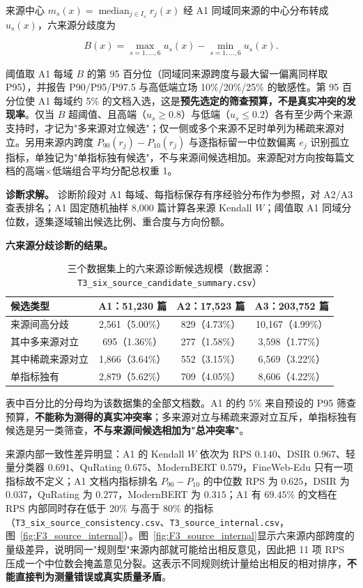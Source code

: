 来源中心 $m_s(x)=\operatorname{median}_{j\in I_s}r_j(x)$ 经 A1 同域同来源的中心分布转成 $u_s(x)$，六来源分歧度为

\begin{equation*}
B(x)=\max_{s=1,\dots,6}u_s(x)-\min_{s=1,\dots,6}u_s(x).
\end{equation*}

阈值取 A1 每域 $B$ 的第 95 百分位（同域同来源跨度与最大留一偏离同样取 P95），并报告 P90/P95/P97.5 与高低端立场 10\%/20\%/25\% 的敏感性。第 95 百分位使 A1 每域约 5\% 的文档入选，这是\textbf{预先选定的筛查预算，不是真实冲突的发现率}。仅当 $B$ 超阈值、且高端（$u_s\ge0.8$）与低端（$u_s\le0.2$）各有至少两个来源支持时，才记为"多来源对立候选"；仅一侧或多个来源不足时单列为稀疏来源对立。另用来源内跨度 $P_{90}(r_j)-P_{10}(r_j)$ 与逐指标留一中位数偏离 $e_j$ 识别孤立指标，单独记为"单指标独有候选"，不与来源间候选相加。来源配对方向按每篇文档的高端$\times$低端组合平均分配总权重 1。

\textbf{诊断求解。} 诊断阶段对 A1 每域、每指标保存有序经验分布作为参照，对 A2/A3 查表排名；A1 固定随机抽样 8,000 篇计算各来源 Kendall $W$；阈值取 A1 同域分位数，逐集逐域输出候选比例、重合度与方向份额。

\textbf{六来源分歧诊断的结果。}

\begin{table}[H]
\centering\small
\caption{三个数据集上的六来源诊断候选规模（数据源：\texttt{T3\_six\_source\_candidate\_summary.csv}）}
\label{tab:q1conflict}
\begin{tabularx}{\textwidth}{@{}lccc@{}}
\toprule
候选类型 & A1：51,230 篇 & A2：17,523 篇 & A3：203,752 篇 \\
\midrule
来源间高分歧 & 2,561（5.00\%） & 829（4.73\%） & 10,167（4.99\%） \\
其中多来源对立 & 695（1.36\%） & 277（1.58\%） & 3,598（1.77\%） \\
其中稀疏来源对立 & 1,866（3.64\%） & 552（3.15\%） & 6,569（3.22\%） \\
单指标独有 & 2,879（5.62\%） & 709（4.05\%） & 8,606（4.22\%） \\
\bottomrule
\end{tabularx}
\end{table}

表中百分比的分母均为该数据集的全部文档数。A1 的约 5\% 来自预设的 P95 筛查预算，\textbf{不能称为测得的真实冲突率}；多来源对立与稀疏来源对立互斥，单指标独有候选是另一类筛查，\textbf{不与来源间候选相加为"总冲突率"}。

来源内部一致性差异明显：A1 的 Kendall $W$ 依次为 RPS $0.140$、DSIR $0.967$、轻量分类器 $0.691$、QuRating $0.675$、ModernBERT $0.579$，FineWeb-Edu 只有一项指标故不定义；A1 文档内指标排名 $P_{90}-P_{10}$ 的中位数 RPS 为 $0.625$，DSIR 为 $0.037$，QuRating 为 $0.277$，ModernBERT 为 $0.315$；A1 有 $69.45\%$ 的文档在 RPS 内部同时存在低于 20\% 与高于 80\% 的指标（\texttt{T3\_six\_source\_consistency.csv}、\texttt{T3\_source\_internal.csv}，图~\ref{fig:F3_source_internal}）。图~\ref{fig:F3_source_internal}显示六来源内部跨度的量级差异，说明同一"规则型"来源内部就可能给出相反意见，因此把 11 项 RPS 压成一个中位数会掩盖意见分裂。这表示不同规则统计量给出相反的相对排序，\textbf{不能直接判为测量错误或真实质量矛盾}。

